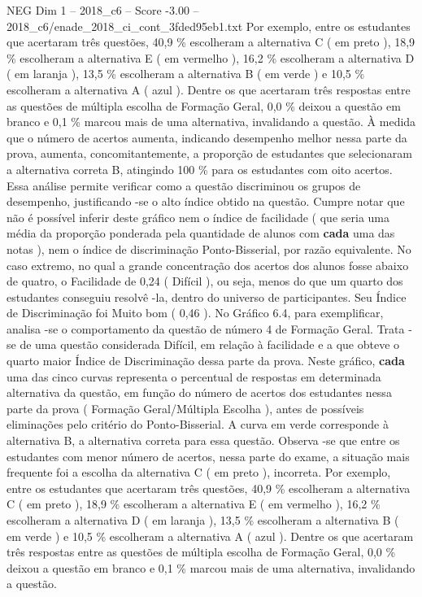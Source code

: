 \begin{textsample}{NEG Dim 1 – 2018\_c6 – Score -3.00 – 2018\_c6/enade\_2018\_ci\_cont\_3fded95eb1.txt}
Por exemplo, entre os estudantes que acertaram três questões, 40,9 \% escolheram a alternativa C ( em preto ), 18,9 \% escolheram a alternativa E ( em vermelho ), 16,2 \% escolheram a alternativa D ( em laranja ), 13,5 \% escolheram a alternativa B ( em verde ) e 10,5 \% escolheram a alternativa A ( azul ).
Dentre os que acertaram três respostas entre as questões de múltipla escolha de Formação Geral, 0,0 \% deixou a questão em branco e 0,1 \% marcou mais de uma alternativa, invalidando a questão.
À medida que o número de acertos aumenta, indicando desempenho melhor nessa parte da prova, aumenta, concomitantemente, a proporção de estudantes que selecionaram a alternativa correta B, atingindo 100 \% para os estudantes com oito acertos.
Essa análise permite verificar como a questão discriminou os grupos de desempenho, justificando -se o alto índice obtido na questão.
Cumpre notar que não é possível inferir deste gráfico nem o índice de facilidade ( que seria uma média da proporção ponderada pela quantidade de alunos com \textbf{cada} uma das notas ), nem o índice de discriminação Ponto-Bisserial, por razão equivalente.
No caso extremo, no qual a grande concentração dos acertos dos alunos fosse abaixo de quatro, o Facilidade de 0,24 ( Difícil ), ou seja, menos do que um quarto dos estudantes conseguiu resolvê -la, dentro do universo de participantes.
Seu Índice de Discriminação foi Muito bom ( 0,46 ).
No Gráfico 6.4, para exemplificar, analisa -se o comportamento da questão de número 4 de Formação Geral.
Trata -se de uma questão considerada Difícil, em relação à facilidade e a que obteve o quarto maior Índice de Discriminação dessa parte da prova.
Neste gráfico, \textbf{cada} uma das cinco curvas representa o percentual de respostas em determinada alternativa da questão, em função do número de acertos dos estudantes nessa parte da prova ( Formação Geral/Múltipla Escolha ), antes de possíveis eliminações pelo critério do Ponto-Bisserial.
A curva em verde corresponde à alternativa B, a alternativa correta para essa questão.
Observa -se que entre os estudantes com menor número de acertos, nessa parte do exame, a situação mais frequente foi a escolha da alternativa C ( em preto ), incorreta.
Por exemplo, entre os estudantes que acertaram três questões, 40,9 \% escolheram a alternativa C ( em preto ), 18,9 \% escolheram a alternativa E ( em vermelho ), 16,2 \% escolheram a alternativa D ( em laranja ), 13,5 \% escolheram a alternativa B ( em verde ) e 10,5 \% escolheram a alternativa A ( azul ).
Dentre os que acertaram três respostas entre as questões de múltipla escolha de Formação Geral, 0,0 \% deixou a questão em branco e 0,1 \% marcou mais de uma alternativa, invalidando a questão.

\end{textsample}
